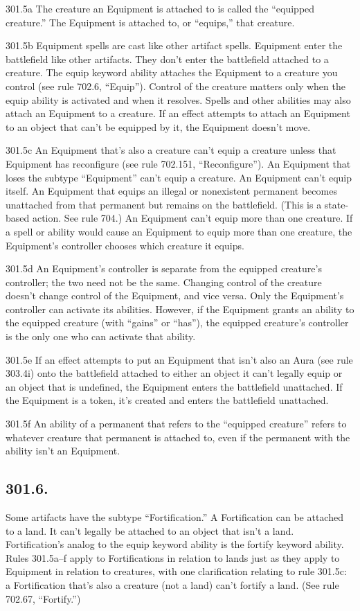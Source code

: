 301.5a The creature an Equipment is attached to is called the “equipped creature.” The Equipment is attached to, or “equips,” that creature.

301.5b Equipment spells are cast like other artifact spells. Equipment enter the battlefield like other artifacts. They don’t enter the battlefield attached to a creature. The equip keyword ability attaches the Equipment to a creature you control (see rule 702.6, “Equip”). Control of the creature matters only when the equip ability is activated and when it resolves. Spells and other abilities may also attach an Equipment to a creature. If an effect attempts to attach an Equipment to an object that can’t be equipped by it, the Equipment doesn’t move.

301.5c An Equipment that’s also a creature can’t equip a creature unless that Equipment has reconfigure (see rule 702.151, “Reconfigure”). An Equipment that loses the subtype “Equipment” can’t equip a creature. An Equipment can’t equip itself. An Equipment that equips an illegal or nonexistent permanent becomes unattached from that permanent but remains on the battlefield. (This is a state-based action. See rule 704.) An Equipment can’t equip more than one creature. If a spell or ability would cause an Equipment to equip more than one creature, the Equipment’s controller chooses which creature it equips.

301.5d An Equipment’s controller is separate from the equipped creature’s controller; the two need not be the same. Changing control of the creature doesn’t change control of the Equipment, and vice versa. Only the Equipment’s controller can activate its abilities. However, if the Equipment grants an ability to the equipped creature (with “gains” or “has”), the equipped creature’s controller is the only one who can activate that ability.

301.5e If an effect attempts to put an Equipment that isn’t also an Aura (see rule 303.4i) onto the battlefield attached to either an object it can’t legally equip or an object that is undefined, the Equipment enters the battlefield unattached. If the Equipment is a token, it’s created and enters the battlefield unattached.

301.5f An ability of a permanent that refers to the “equipped creature” refers to whatever creature that permanent is attached to, even if the permanent with the ability isn’t an Equipment.

\subsection*{301.6.}
Some artifacts have the subtype “Fortification.” A Fortification can be attached to a land. It can’t legally be attached to an object that isn’t a land. Fortification’s analog to the equip keyword ability is the fortify keyword ability. Rules 301.5a–f apply to Fortifications in relation to lands just as they apply to Equipment in relation to creatures, with one clarification relating to rule 301.5c: a Fortification that’s also a creature (not a land) can’t fortify a land. (See rule 702.67, “Fortify.”)

